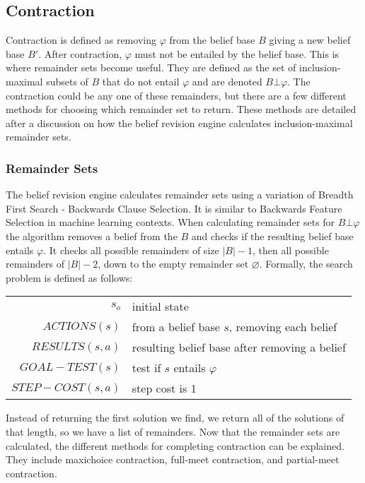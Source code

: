 \documentclass[a4paper,10pt]{article}
\newcommand{\norm}[1]{\lvert #1 \rvert}
\begin{document}
\subsection{Contraction}
\label{subsec:contraction}
Contraction is defined as removing $\varphi$ from the belief base $B$ giving a new belief base $B'$. After contraction, $\varphi$ must not be entailed by the belief base. This is where remainder sets become useful. They are defined as the set of inclusion-maximal subsets of $B$ that do not entail $\varphi$ and are denoted $B \bot\varphi$. The contraction could be any one of these remainders, but there are a few different methods for choosing which remainder set to return. These methods are detailed after a discussion on how the belief revision engine calculates inclusion-maximal remainder sets.

\subsubsection{Remainder Sets}
\label{subsubsec:remainders}
The belief revision engine calculates remainder sets using a variation of Breadth First Search - Backwards Clause Selection. It is similar to Backwards Feature Selection in machine learning contexts. When calculating remainder sets for $B \bot\varphi$ the algorithm removes a belief from the $B$ and checks if the resulting belief base entails $\varphi$. It checks all possible remainders of size $\norm{B}-1$, then all possible remainders of $\norm{B}-2$, down to the empty remainder set $\varnothing$. Formally, the search problem is defined as follows:
\begin{table}[!htb]
\centering
\begin{tabular}{rl}
$s_o$ & initial state \\
$ACTIONS(s)$ & from a belief base $s$, removing each belief \\
$RESULTS(s, a)$ & resulting belief base after removing a belief \\
$GOAL-TEST(s)$ & test if $s$ entails $\varphi$ \\
$STEP-COST(s,a)$ & step cost is 1 \\
\end{tabular}
\end{table}

Instead of returning the first solution we find, we return all of the solutions of that length, so we have a list of remainders. Now that the remainder sets are calculated, the different methods for completing contraction can be explained. They include maxichoice contraction, full-meet contraction, and partial-meet contraction.
\end{document}

